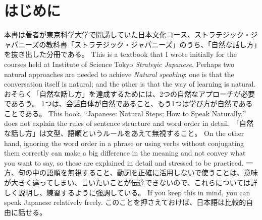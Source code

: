 \documentclass[uplatex,dvipdfmx,b5paper,english,10pt]{jsbook}
\newif\ifPREFACE
\begin{document}
\frontmatter
\thispagestyle{empty}

%


\ifEnglish
\setlength{\parindent}{3em}
\else
\fi

\ifPREFACE
\ifEnglish
\chapter*{Preface}
\else
\chapter*{はじめに}
\fi

\ifJapanese
本書は著者が東京科学大学で開講していた日本文化コース、ストラテジック・ジャパニーズの教科書「ストラテジック・ジャパニーズ」のうち、「自然な話し方」を抜き出した分冊である。
\else
This is a textbook that I wrote initially for the courses held at Institute of Science Tokyo {\itshape Strategic Japanese\/}.
\fi
\ifEnglish
Perhaps two natural approaches are needed to achieve {\it Natural speaking\/}:
one is that the conversation itself is natural; and the other is that the way of learning is natural.
\else
おそらく「自然な話し方」を達成するためには、2つの自然なアプローチが必要であろう。
1つは、会話自体が自然であること、もう1つは学び方が自然であることである。
\fi
\ifEnglish
This book, ``Japanese: Natural Steps; How to Speak Naturally,'' does not explain the rules of sentence structure and word order in detail.
\else
「自然な話し方」は文型、語順というルールをあえて無視すること。
\fi
\ifEnglish
On the other hand, ignoring the word order in a phrase or using verbs without conjugating them correctly can make a big difference in the meaning and not convey what you want to say, so these are explained in detail and stressed to be practiced.
\else
一方、句の中の語順を無視すること、動詞を正確に活用しないで使うことは、意味が大きく違ってしまい、言いたいことが伝達できないので、これらについては詳しく説明し、練習するように強調している。
\fi
\ifEnglish
If you keep this in mind, you can speak Japanese relatively freely.
\else
このことを押さえておけば、日本語は比較的自由に話せる。
\fi
\end{document}
